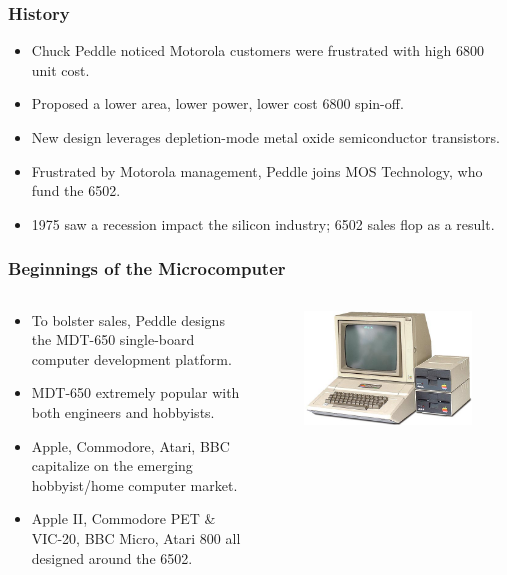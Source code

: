 \documentclass{beamer}
\begin{document}
\begin{frame}
\frametitle{History}
\begin{itemize}
\item Chuck Peddle noticed Motorola customers were frustrated with high 6800 unit cost.
\item Proposed a lower area, lower power, lower cost 6800 spin-off.
\item New design leverages depletion-mode metal oxide semiconductor transistors.
\item Frustrated by Motorola management, Peddle joins MOS Technology, who fund the 6502.
\item 1975 saw a recession impact the silicon industry; 6502 sales flop as a result.
\end{itemize}
\end{frame}

\begin{frame}
\frametitle{Beginnings of the Microcomputer}
\begin{columns}[T]
\begin{column}[T]{0.6\textwidth}
\begin{itemize}
\item To bolster sales, Peddle designs the MDT-650 single-board computer development platform.
\item MDT-650 extremely popular with both engineers and hobbyists.
\item Apple, Commodore, Atari, BBC capitalize on the emerging hobbyist/home computer market.
\item Apple II, Commodore PET \& VIC-20, BBC Micro, Atari 800 all designed around the 6502.
\end{itemize}
\end{column}
\begin{column}[T]{0.4\textwidth}
\begin{figure}
\centering
\includegraphics[scale=0.225]{images/appleii-system.jpg}
\end{figure}
\end{column}
\end{columns}
\end{frame}
\end{document}
